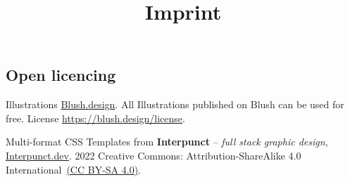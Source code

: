 \documentclass{article}
\begin{document}
\title{Imprint}

\maketitle


\subsection{Open licencing}\label{H8275517}



Illustrations \href{https://blush.design/}{Blush.design}. All Illustrations published on Blush can be used for free. License \href{https://blush.design/license}{https://blush.design/license}.


Multi-format CSS Templates from \textbf{Interpunct} – \emph{full stack graphic design,} \href{https://interpunct.dev/}{Interpunct.dev}. 2022 Creative Commons: Attribution-ShareAlike 4.0 International \href{https://creativecommons.org/licenses/by-sa/4.0/}{(CC BY-SA 4.0)}.
\end{document}
